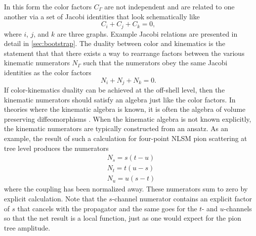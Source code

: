 \documentclass[11pt,letter]{article}
\begin{document}
In this form the color factors $C_\Gamma$ are not independent and are related to
one another via a set of Jacobi identities that look schematically
like
\begin{equation}
C_i+C_j+C_k=0,
\end{equation}
where $i$, $j$, and $k$ are three graphs.  Example Jacobi relations
are presented in detail in \cref{sec:bootstrap}. The duality between color and kinematics is the statement that that there exists a way to rearrange factors between
the various kinematic numerators $N_\Gamma$ such that the numerators
obey the same Jacobi identities as the color factors
\begin{equation}
N_i +N_j +N_k=0.
\end{equation}
If color-kinematics duality can be achieved at the off-shell level,
then the kinematic numerators should satisfy an algebra just like the
color factors.  In theories where the kinematic algebra is known, it
is often the algebra of volume preserving diffeomorphisms
\cite{Monteiro2011pc, Ben-Shahar:2021zww, Cheung:2020djz,
  Cheung:2021zvb, Cheung:2022mix}.
When the kinematic algebra is not known explicitly, the kinematic numerators are typically constructed from an ansatz.
As an example, the result of such a calculation for four-point NLSM pion scattering at tree level produces the numerators
\begin{align}
&N_s = s(t-u)\\
&N_t = t(u-s)\\
&N_u = u(s-t)
\end{align}
where the coupling has been normalized away.  These numerators sum to
zero by explicit calculation.  Note that the $s$-channel numerator
contains an explicit factor of $s$ that cancels with the propagator
and the same goes for the $t$- and $u$-channels so that the net result
is a local function, just as one would expect for the pion tree
amplitude.
\end{document}
